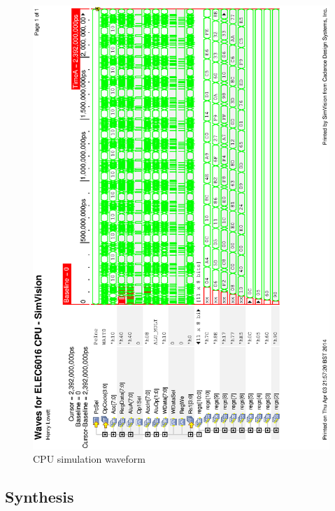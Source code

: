 \begin{figure}
\includegraphics[height=\textheight]{Figures/cpusim.eps}
\caption{CPU simulation waveform}
\label{fig:cpusim}
\end{figure}

\subsection{Synthesis}


